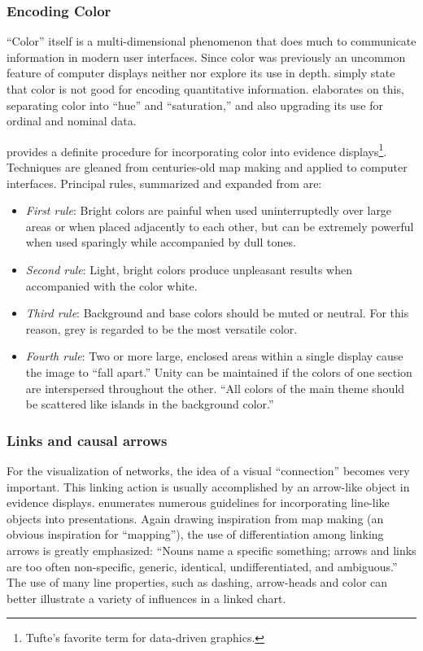 	\subsubsection{Encoding Color}

``Color'' itself is a multi-dimensional phenomenon that does much to communicate information in modern user interfaces. Since color was previously an uncommon feature of computer displays neither  nor  explore its use in depth.  simply state that color is not good for encoding quantitative information.  elaborates on this, separating color into ``hue'' and ``saturation,'' and also upgrading its use for ordinal and nominal data. 

 provides a definite procedure for incorporating color into evidence displays\footnote{Tufte's favorite term for data-driven graphics.}. Techniques are gleaned from centuries-old map making and applied to computer interfaces. Principal rules, summarized and expanded from  are:

	\begin{itemize}
		\item \emph{First rule}: Bright colors are painful when used uninterruptedly over large areas or when placed adjacently to each other, but can be extremely powerful when used sparingly while accompanied by dull tones.
		\item \emph{Second rule}: Light, bright colors produce unpleasant results when accompanied with the color white.
		\item \emph{Third rule}: Background and base colors should be muted or neutral. For this reason, grey is regarded to be the most versatile color.
		\item \emph{Fourth rule}: Two or more large, enclosed areas within a single display cause the image to ``fall apart.'' Unity can be maintained if the colors of one section are interspersed throughout the other. ``All colors of the main theme should be scattered like islands in the background color.''
	\end{itemize}

	\subsubsection{Links and causal arrows}

For the visualization of networks, the idea of a visual ``connection'' becomes very important. This linking action is usually accomplished by an arrow-like object in evidence displays.  enumerates numerous guidelines for incorporating line-like objects into presentations. Again drawing inspiration from map making (an obvious inspiration for ``mapping''), the use of differentiation among linking arrows is greatly emphasized: ``Nouns name a specific something; arrows and links are too often non-specific, generic, identical, undifferentiated, and ambiguous.'' The use of many line properties, such as dashing, arrow-heads and color can better illustrate a variety of influences in a linked chart.

